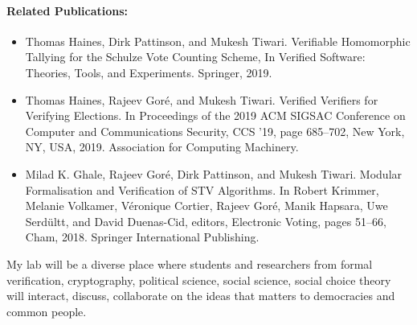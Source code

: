 \documentclass[a4paper]{article}
\begin{document}
\paragraph{Related Publications:}
\begin{itemize}
    \item {Thomas Haines, Dirk Pattinson, and Mukesh Tiwari.} 
    {Verifiable Homomorphic Tallying for the Schulze Vote Counting Scheme, 
    In Verified Software: Theories, Tools, and Experiments. Springer, 2019.}

    \item  {Thomas Haines, Rajeev Gor{\'e}, and Mukesh Tiwari. 
    Verified Verifiers for Verifying Elections. In Proceedings of the 2019 ACM SIGSAC Conference on 
    Computer and Communications Security, CCS '19, page 685--702, New York, NY, 
    USA, 2019. Association for Computing Machinery.}
    
    \item {Milad K. Ghale, Rajeev Gor{\'e}, Dirk Pattinson, and Mukesh Tiwari.
    Modular Formalisation and Verification of STV Algorithms. In Robert Krimmer, Melanie Volkamer, 
    V{\'e}ronique Cortier, 
    Rajeev Gor{\'e}, Manik Hapsara, Uwe Serd{\"u}ltt, and David Duenas-Cid, editors, 
    Electronic Voting, pages 51--66, Cham, 2018. Springer International Publishing.}
  
\end{itemize}

My lab will be a diverse place where students and researchers from formal 
verification, cryptography, 
political science, social science, social choice theory will interact, discuss, 
collaborate on the ideas that matters to democracies and common people. 
\end{document}
